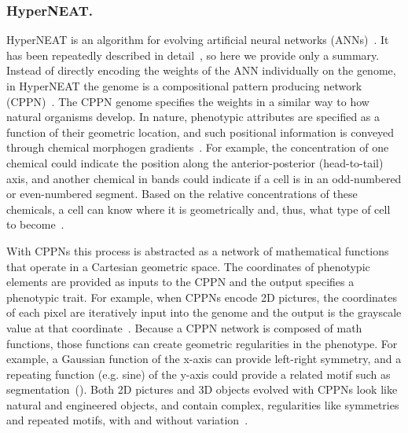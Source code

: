 
\subsubsection{HyperNEAT.}


HyperNEAT is an algorithm for evolving artificial neural networks (ANNs)~\cite{stanley2009hypercube}. It has been repeatedly described in detail~\cite{stanley2009hypercube,gauci2007generating,clune2011performance},  so here we provide only a summary. Instead of directly encoding the weights of the ANN individually on the genome, in HyperNEAT the genome is a compositional pattern producing network (CPPN)~\cite{stanley2007CPPN}. The CPPN genome specifies the weights in a similar way to how natural organisms develop. In nature, phenotypic attributes are specified as a function of their geometric location, and such positional information is conveyed through chemical morphogen gradients~\cite{carroll2005endless}. For example, the concentration of one chemical could indicate the position along the anterior-posterior (head-to-tail) axis, and another chemical in bands could indicate if a cell is in an odd-numbered or even-numbered segment. Based on the relative concentrations of these chemicals, a cell can know where it is geometrically and, thus, what type of cell to become~\cite{carroll2005endless}. 

With CPPNs this process is abstracted as a network of mathematical functions that operate in a Cartesian geometric space. The coordinates of phenotypic elements are provided as inputs to the CPPN and the output specifies a phenotypic trait. For example, when CPPNs encode 2D pictures, the coordinates of each pixel are iteratively input into the genome and the output is the grayscale value at that coordinate~\cite{secretan2011picbreeder}. Because a CPPN network is composed of math functions, those functions can create geometric regularities in the phenotype. For example, a Gaussian function of the x-axis can provide left-right symmetry, and a repeating function (e.g. sine) of the y-axis could provide a related motif such as segmentation~(). Both 2D pictures and 3D objects evolved with CPPNs look like natural and engineered objects, and contain complex, regularities like symmetries and repeated motifs, with and without variation~\cite{secretan2011picbreeder,clune2011objects}. 

